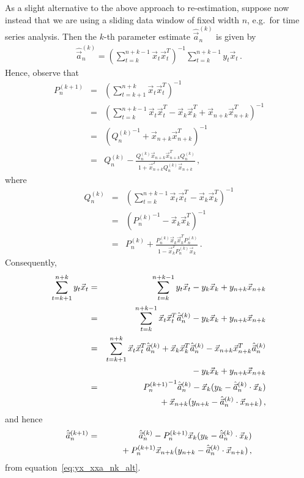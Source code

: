 \documentclass[a4paper]{article}
\begin{document}
As a slight alternative to the above approach to re-estimation,
 suppose now instead that we are using a sliding data window of fixed width $n$, e.g.\ for time series analysis.
Then the $k$-th parameter estimate $\hat{\vec{a}}_{n}^{(k)}$ is given by
\begin{eqnarray}
   \hat{\vec{a}}_{n}^{(k)} = \left(\sum_{t=k}^{n+k-1}\vec{x}_t\vec{x}_t^{T}\right)^{-1}\sum_{t=k}^{n+k-1} y_t\vec{x}_t\,.
\label{eq:yx_xxa_nk_alt}
\end{eqnarray}
Hence, observe that
\begin{eqnarray}
   P_{n}^{(k+1)} & = & \left(\sum_{t=k+1}^{n+k}\vec{x}_t\vec{x}_t^{T}\right)^{-1}
\nonumber\\
  & = & \left(\sum_{t=k}^{n+k-1}\vec{x}_t\vec{x}_t^{T}-\vec{x}_k\vec{x}_k^T+\vec{x}_{n+k}\vec{x}_{n+k}^{T}\right)^{-1}
\nonumber\\
  & = & \left({Q_n^{(k)}}^{-1}+\vec{x}_{n+k}\vec{x}_{n+k}^{T}\right)^{-1}
\nonumber\\
  & = & Q_n^{(k)}-\frac{Q_n^{(k)}\vec{x}_{n+k}\vec{x}_{n+k}^{T}Q_n^{(k)}}{1+\vec{x}_{n+k}^{T}Q_n^{(k)}\vec{x}_{n+k}}\,,
\end{eqnarray}
where
\begin{eqnarray}
   Q_{n}^{(k)} & = & \left(\sum_{t=k}^{n+k-1}\vec{x}_t\vec{x}_t^{T}-\vec{x}_k\vec{x}_k^T\right)^{-1}
\nonumber\\
  & = & \left({P_n^{(k)}}^{-1}-\vec{x}_{k}\vec{x}_{k}^{T}\right)^{-1}
\nonumber\\
  & = & P_n^{(k)}+\frac{P_n^{(k)}\vec{x}_{k}\vec{x}_{k}^{T}P_n^{(k)}}{1-\vec{x}_{k}^{T}P_n^{(k)}\vec{x}_{k}}\,.
\end{eqnarray}
Consequently, 
\begin{eqnarray}
   \sum_{t=k+1}^{n+k} y_t\vec{x}_t & = & \sum_{t=k}^{n+k-1} y_t\vec{x}_t-y_k\vec{x}_k+y_{n+k}\vec{x}_{n+k}
\nonumber\\
& = & \sum_{t=k}^{n+k-1}\vec{x}_t\vec{x}_t^{T}\hat{\vec{a}}_n^{(k)}-y_k\vec{x}_k+y_{n+k}\vec{x}_{n+k}
\nonumber\\
& = & \sum_{t=k+1}^{n+k}\vec{x}_t\vec{x}_t^{T}\hat{\vec{a}}_n^{(k)}
+\vec{x}_k\vec{x}_k^{T}\hat{\vec{a}}_n^{(k)}-\vec{x}_{n+k}\vec{x}_{n+k}^{T}\hat{\vec{a}}_n^{(k)}
\nonumber\\
&&        \hspace*{10mm}{}-y_k\vec{x}_k+y_{n+k}\vec{x}_{n+k}
\nonumber\\
& = & {P_{n}^{(k+1)}}^{-1}\hat{\vec{a}}_n^{(k)}
-\vec{x}_{k}(y_{k}-\hat{\vec{a}}_n^{(k)}\cdot\vec{x}_{k})
\nonumber\\
&& \hspace*{10mm}{}+\vec{x}_{n+k}(y_{n+k}-\hat{\vec{a}}_n^{(k)}\cdot\vec{x}_{n+k})\,,
\end{eqnarray}
and hence
\begin{eqnarray}
   \hat{\vec{a}}_{n}^{(k+1)} & = & \hat{\vec{a}}_{n}^{(k)}
-P_n^{(k+1)}\vec{x}_{k}(y_{k}-\hat{\vec{a}}_n^{(k)}\cdot\vec{x}_{k})
\nonumber\\
&&\hspace*{6mm}{}+P_n^{(k+1)}\vec{x}_{n+k}(y_{n+k}-\hat{\vec{a}}_n^{(k)}\cdot\vec{x}_{n+k})
\,,
\label{eq:yx_xxa_nkp1_alt}
\end{eqnarray}
from equation~\eqref{eq:yx_xxa_nk_alt}.
\end{document}
